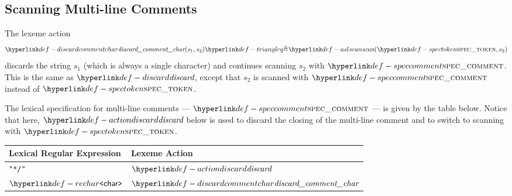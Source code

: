 \subsection{Scanning Multi-line Comments\label{sec:scanningmultilinecomments}}
The lexeme action
\hypertarget{def-discardcommentchar}{}
\[
\discardcommentchar(s_1, s_2) \triangleq \aslscan(\spectoken, s_2)
\]
discards the string $s_1$ (which is always a single character) and continues scanning $s_2$ with $\speccomment$.
This is the same as $\discard$, except that $s_2$ is scanned with $\speccomment$ instead of $\spectoken$.

\hypertarget{def-speccomment}{}
The lexical specification for multi-line comments --- $\speccomment$ --- is given by the table below.
%
Notice that here, $\actiondiscard$ below is used to discard the closing of the multi-line comment and to switch
to scanning with $\spectoken$.

\begin{center}
\begin{tabular}{ll}
\textbf{Lexical Regular Expression} & \textbf{Lexeme Action}\\
\hline
\texttt{"*/"} & $\actiondiscard$ \\
$\REchar$     & $\discardcommentchar$ \\
\hline
\end{tabular}
\end{center}
